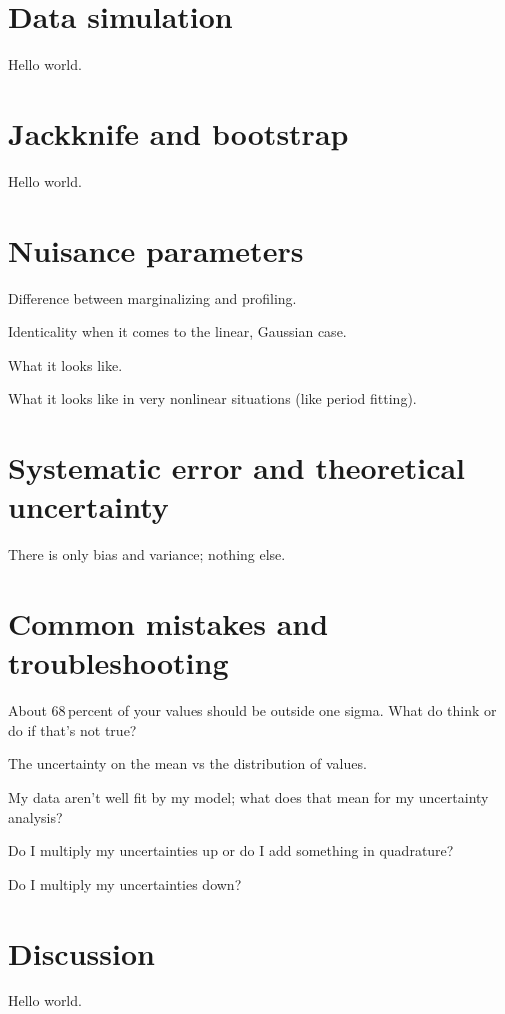 \documentclass[12pt, letterpaper]{article}
\begin{document}
\section{Data simulation}

Hello world.

\section{Jackknife and bootstrap}

Hello world.

\section{Nuisance parameters}

Difference between marginalizing and profiling.

Identicality when it comes to the linear, Gaussian case.

What it looks like.

What it looks like in very nonlinear situations (like period fitting).

\section{Systematic error and theoretical uncertainty}

There is only bias and variance; nothing else.

\section{Common mistakes and troubleshooting}

About 68\,percent of your values should be outside one sigma. What do think
or do if that's not true?

The uncertainty on the mean vs the distribution of values.

My data aren't well fit by my model; what does that mean for my uncertainty
analysis?

Do I multiply my uncertainties up or do I add something in quadrature?

Do I multiply my uncertainties down?

\section{Discussion}

Hello world.
\end{document}
